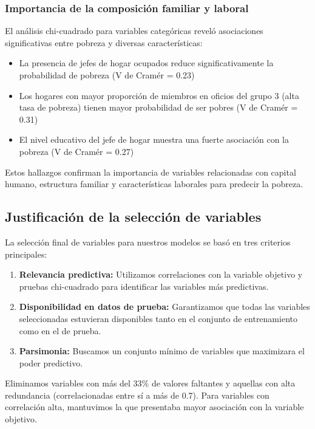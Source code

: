 \documentclass[12pt,a4paper,onecolumn]{article}
\begin{document}
\subsubsection{Importancia de la composición familiar y laboral}

El análisis chi-cuadrado para variables categóricas reveló asociaciones significativas entre pobreza y diversas características:

\begin{itemize}
    \item La presencia de jefes de hogar ocupados reduce significativamente la probabilidad de pobreza (V de Cramér = 0.23)
    \item Los hogares con mayor proporción de miembros en oficios del grupo 3 (alta tasa de pobreza) tienen mayor probabilidad de ser pobres (V de Cramér = 0.31)
    \item El nivel educativo del jefe de hogar muestra una fuerte asociación con la pobreza (V de Cramér = 0.27)
\end{itemize}

Estos hallazgos confirman la importancia de variables relacionadas con capital humano, estructura familiar y características laborales para predecir la pobreza.

\subsection{Justificación de la selección de variables}

La selección final de variables para nuestros modelos se basó en tres criterios principales:

\begin{enumerate}
    \item \textbf{Relevancia predictiva:} Utilizamos correlaciones con la variable objetivo y pruebas chi-cuadrado para identificar las variables más predictivas.
    \item \textbf{Disponibilidad en datos de prueba:} Garantizamos que todas las variables seleccionadas estuvieran disponibles tanto en el conjunto de entrenamiento como en el de prueba.
    \item \textbf{Parsimonia:} Buscamos un conjunto mínimo de variables que maximizara el poder predictivo.
\end{enumerate}

Eliminamos variables con más del 33\% de valores faltantes y aquellas con alta redundancia (correlacionadas entre sí a más de 0.7). Para variables con correlación alta, mantuvimos la que presentaba mayor asociación con la variable objetivo.
\end{document}
